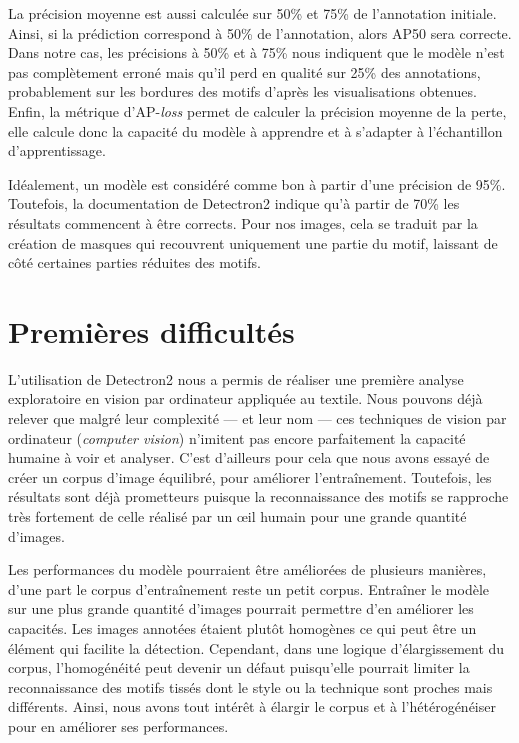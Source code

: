 \documentclass[a4paper, twoside, 12pt]{book}
\begin{document}
La précision moyenne est aussi calculée sur 50\% et 75\% de l'annotation initiale. Ainsi, si la prédiction correspond à 50\% de l'annotation, alors AP50 sera correcte. Dans notre cas, les précisions à 50\% et à 75\% nous indiquent que le modèle n'est pas complètement erroné mais qu'il perd en qualité sur 25\% des annotations, probablement sur les bordures des motifs d'après les visualisations obtenues. 
Enfin, la métrique d'AP-\textit{loss} permet de calculer la précision moyenne de la perte, elle calcule donc la capacité du modèle à apprendre et à s'adapter à l'échantillon d'apprentissage.

Idéalement, un modèle est considéré comme bon à partir d'une précision de 95\%. Toutefois, la documentation de Detectron2 indique qu'à partir de 70\% les résultats commencent à être corrects. Pour nos images, cela se traduit par la création de masques qui recouvrent uniquement une partie du motif, laissant de côté certaines parties réduites des motifs.

\section{Premières difficultés}

L'utilisation de Detectron2 nous a permis de réaliser une première analyse exploratoire en vision par ordinateur appliquée au textile. Nous pouvons déjà relever que malgré leur complexité --- et leur nom --- ces techniques de \og vision par ordinateur \fg (\textit{computer vision}) n'imitent pas encore parfaitement la capacité humaine à voir et analyser. C'est d'ailleurs pour cela que nous avons essayé de créer un corpus d'image équilibré, pour améliorer l'entraînement. Toutefois, les résultats sont déjà prometteurs puisque la reconnaissance des motifs se rapproche très fortement de celle réalisé par un \oe{}il humain pour une grande quantité d'images. 

Les performances du modèle pourraient être améliorées de plusieurs manières, d'une part le corpus d'entraînement reste un petit corpus. Entraîner le modèle sur une plus grande quantité d'images pourrait permettre d'en améliorer les capacités. Les images annotées étaient plutôt homogènes ce qui peut être un élément qui facilite la détection. Cependant, dans une logique d'élargissement du corpus, l'homogénéité peut devenir un défaut puisqu'elle pourrait limiter la reconnaissance des motifs tissés dont le style ou la technique sont proches mais différents. Ainsi, nous avons tout intérêt à élargir le corpus et à l'hétérogénéiser pour en améliorer ses performances. 
\end{document}
